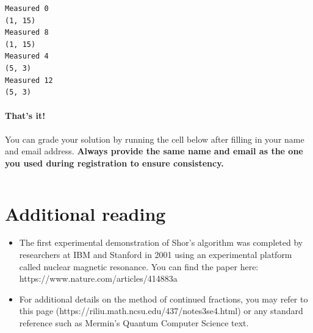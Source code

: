 \documentclass[11pt]{article}
\makeatletter
\providecommand{\tightlist}{%
      \setlength{\itemsep}{0pt}\setlength{\parskip}{0pt}}
\newcommand{\boxspacing}{\kern\kvtcb@left@rule\kern\kvtcb@boxsep}
\newcommand{\prompt}[4]{
        \ttfamily\llap{{\color{#2}[#3]:\hspace{3pt}#4}}\vspace{-\baselineskip}
    }
\makeatother
\begin{document}
    \begin{Verbatim}[commandchars=\\\{\}]
Measured 0
(1, 15)
Measured 8
(1, 15)
Measured 4
(5, 3)
Measured 12
(5, 3)
    \end{Verbatim}

    \hypertarget{thats-it}{%
\paragraph{That's it!}\label{thats-it}}

You can grade your solution by running the cell below after filling in
your name and email address. \textbf{Always provide the same name and
email as the one you used during registration to ensure consistency.}

    \begin{tcolorbox}[breakable, size=fbox, boxrule=1pt, pad at break*=1mm,colback=cellbackground, colframe=cellborder]
\prompt{In}{incolor}{ }{\boxspacing}
\begin{Verbatim}[commandchars=\\\{\}]

\end{Verbatim}
\end{tcolorbox}

    \hypertarget{additional-reading}{%
\section{Additional reading}\label{additional-reading}}

\begin{itemize}
\tightlist
\item
  The first experimental demonstration of Shor's algorithm was completed
  by researchers at IBM and Stanford in 2001 using an experimental
  platform called nuclear magnetic resonance. You can find the paper
  here: https://www.nature.com/articles/414883a
\item
  For additional details on the method of continued fractions, you may
  refer to this page (https://riliu.math.ncsu.edu/437/notes3se4.html) or
  any standard reference such as Mermin's Quantum Computer Science text.
\end{itemize}


    
    
    
\end{document}
